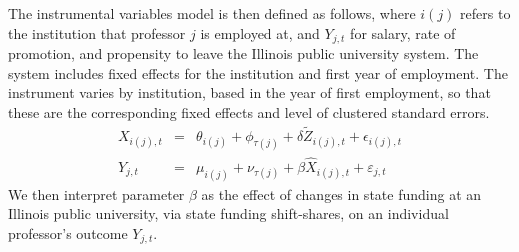 The instrumental variables model is then defined as follows, where $i(j)$ refers to the institution that professor $j$ is employed at, and $Y_{j,t}$ for salary, rate of promotion, and propensity to leave the Illinois public university system.
The system includes fixed effects for the institution and first year of employment.
The instrument varies by institution, based in the year of first employment, so that these are the corresponding fixed effects and level of clustered standard errors.
\begin{eqnarray}
    \label{eqn:secondstage1_indiv}
    X_{i(j),t} &=& \theta_{i(j)} + \phi_{\tau(j)} + \delta \tilde Z_{i(j),t} + \epsilon_{i(j),t} \\
    \label{eqn:secondstage2_indiv}
    Y_{j,t} &=& \mu_{i(j)} + \nu_{\tau(j)} + \beta \widehat X_{i(j),t} + \varepsilon_{j,t}
\end{eqnarray}
We then interpret parameter $\beta$ as the effect of changes in state funding at an Illinois public university, via state funding shift-shares, on an individual professor's outcome $Y_{j,t}$.

